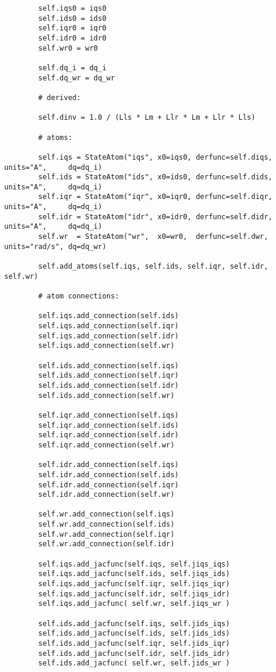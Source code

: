 \begin{lstlisting}
        self.iqs0 = iqs0
        self.ids0 = ids0
        self.iqr0 = iqr0
        self.idr0 = idr0
        self.wr0 = wr0

        self.dq_i = dq_i
        self.dq_wr = dq_wr

        # derived:

        self.dinv = 1.0 / (Lls * Lm + Llr * Lm + Llr * Lls)

        # atoms:

        self.iqs = StateAtom("iqs", x0=iqs0, derfunc=self.diqs, units="A",     dq=dq_i)
        self.ids = StateAtom("ids", x0=ids0, derfunc=self.dids, units="A",     dq=dq_i)
        self.iqr = StateAtom("iqr", x0=iqr0, derfunc=self.diqr, units="A",     dq=dq_i)
        self.idr = StateAtom("idr", x0=idr0, derfunc=self.didr, units="A",     dq=dq_i)
        self.wr  = StateAtom("wr",  x0=wr0,  derfunc=self.dwr,  units="rad/s", dq=dq_wr)

        self.add_atoms(self.iqs, self.ids, self.iqr, self.idr, self.wr)

        # atom connections:

        self.iqs.add_connection(self.ids)
        self.iqs.add_connection(self.iqr)
        self.iqs.add_connection(self.idr)
        self.iqs.add_connection(self.wr)

        self.ids.add_connection(self.iqs)
        self.ids.add_connection(self.iqr)
        self.ids.add_connection(self.idr)
        self.ids.add_connection(self.wr)

        self.iqr.add_connection(self.iqs)
        self.iqr.add_connection(self.ids)
        self.iqr.add_connection(self.idr)
        self.iqr.add_connection(self.wr)

        self.idr.add_connection(self.iqs)
        self.idr.add_connection(self.ids)
        self.idr.add_connection(self.iqr)
        self.idr.add_connection(self.wr)

        self.wr.add_connection(self.iqs)
        self.wr.add_connection(self.ids)
        self.wr.add_connection(self.iqr)
        self.wr.add_connection(self.idr)

        self.iqs.add_jacfunc(self.iqs, self.jiqs_iqs)
        self.iqs.add_jacfunc(self.ids, self.jiqs_ids)
        self.iqs.add_jacfunc(self.iqr, self.jiqs_iqr)
        self.iqs.add_jacfunc(self.idr, self.jiqs_idr)
        self.iqs.add_jacfunc( self.wr, self.jiqs_wr )

        self.ids.add_jacfunc(self.iqs, self.jids_iqs)
        self.ids.add_jacfunc(self.ids, self.jids_ids)
        self.ids.add_jacfunc(self.iqr, self.jids_iqr)
        self.ids.add_jacfunc(self.idr, self.jids_idr)
        self.ids.add_jacfunc( self.wr, self.jids_wr )


\end{lstlisting}
